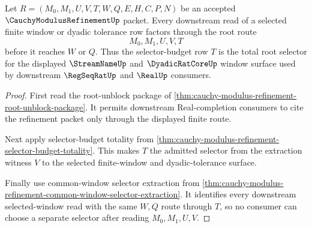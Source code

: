\begin{theorem}
\label{thm:cauchy-modulus-refinement-root-window-selector-totality}
Let $R=(M_0,M_1,U,V,T,W,Q,E,H,C,P,N)$ be an accepted $\CauchyModulusRefinementUp$ packet. Every downstream read of a selected finite window or dyadic tolerance row factors through the root route
$$
M_0,M_1,U,V,T
$$
before it reaches $W$ or $Q$. Thus the selector-budget row $T$ is the total root selector for the displayed $\StreamNameUp$ and $\DyadicRatCoreUp$ window surface used by downstream $\RegSeqRatUp$ and $\RealUp$ consumers.
\end{theorem}
\begin{proof}
First read the root-unblock package of \autoref{thm:cauchy-modulus-refinement-root-unblock-package}. It permits downstream Real-completion consumers to cite the refinement packet only through the displayed finite route.

Next apply selector-budget totality from \autoref{thm:cauchy-modulus-refinement-selector-budget-totality}. This makes $T$ the admitted selector from the extraction witness $V$ to the selected finite-window and dyadic-tolerance surface.

Finally use common-window selector extraction from \autoref{thm:cauchy-modulus-refinement-common-window-selector-extraction}. It identifies every downstream selected-window read with the same $W,Q$ route through $T$, so no consumer can choose a separate selector after reading $M_0,M_1,U,V$.
\end{proof}


